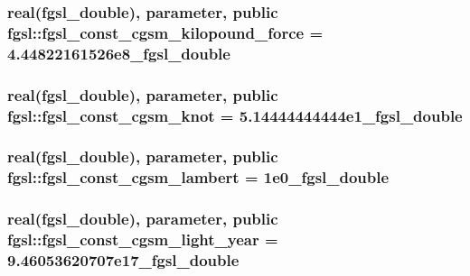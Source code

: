\subsubsection[{fgsl\+\_\+const\+\_\+cgsm\+\_\+kilopound\+\_\+force}]{\setlength{\rightskip}{0pt plus 5cm}real({\bf fgsl\+\_\+double}), parameter, public fgsl\+::fgsl\+\_\+const\+\_\+cgsm\+\_\+kilopound\+\_\+force = 4.\+44822161526e8\+\_\+fgsl\+\_\+double}\label{namespacefgsl_aca0248b47e63c840ed0ab430927008f1}
\hypertarget{namespacefgsl_a7b637a368f16bed373b7ff18193b8417}{}
\subsubsection[{fgsl\+\_\+const\+\_\+cgsm\+\_\+knot}]{\setlength{\rightskip}{0pt plus 5cm}real({\bf fgsl\+\_\+double}), parameter, public fgsl\+::fgsl\+\_\+const\+\_\+cgsm\+\_\+knot = 5.\+14444444444e1\+\_\+fgsl\+\_\+double}\label{namespacefgsl_a7b637a368f16bed373b7ff18193b8417}
\hypertarget{namespacefgsl_a9dcbf51e3d416e2da01a503e5ba573bc}{}
\subsubsection[{fgsl\+\_\+const\+\_\+cgsm\+\_\+lambert}]{\setlength{\rightskip}{0pt plus 5cm}real({\bf fgsl\+\_\+double}), parameter, public fgsl\+::fgsl\+\_\+const\+\_\+cgsm\+\_\+lambert = 1e0\+\_\+fgsl\+\_\+double}\label{namespacefgsl_a9dcbf51e3d416e2da01a503e5ba573bc}
\hypertarget{namespacefgsl_a7a0fc1754861e860249707775c149bd8}{}
\subsubsection[{fgsl\+\_\+const\+\_\+cgsm\+\_\+light\+\_\+year}]{\setlength{\rightskip}{0pt plus 5cm}real({\bf fgsl\+\_\+double}), parameter, public fgsl\+::fgsl\+\_\+const\+\_\+cgsm\+\_\+light\+\_\+year = 9.\+46053620707e17\+\_\+fgsl\+\_\+double}\label{namespacefgsl_a7a0fc1754861e860249707775c149bd8}
\hypertarget{namespacefgsl_aa765c28c4966a92d631fc0d4721e7160}{}
